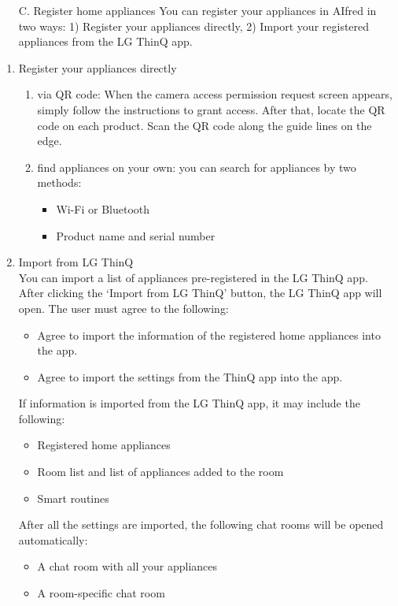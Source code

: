 \documentclass[conference]{IEEEtran}
\begin{document}
\begin{itemize}
    \item [C.] Register home appliances 
    You can register your appliances in AIfred in two ways: 1) Register your appliances directly, 2) Import your registered appliances from the LG ThinQ app.
\end{itemize}

\begin{enumerate}
    \item Register your appliances directly
    \begin{enumerate}
        \item via QR code: When the camera access permission request screen appears, simply follow the instructions to grant access. After that, locate the QR code on each product. Scan the QR code along the guide lines on the edge.
        \item find appliances on your own: you can search for appliances by two methods:
        \begin{itemize}
            \item Wi-Fi or Bluetooth
            \item Product name and serial number
        \end{itemize}
    \end{enumerate}
    \item Import from LG ThinQ \\
    You can import a list of appliances pre-registered in the LG ThinQ app. After clicking the `Import from LG ThinQ' button, the LG ThinQ app will open. The user must agree to the following:
    \begin{itemize}
        \item Agree to import the information of the registered home appliances into the app.
        \item Agree to import the settings from the ThinQ app into the app.
    \end{itemize}
    If information is imported from the LG ThinQ app, it may include the following:
    \begin{itemize}
        \item Registered home appliances
        \item Room list and list of appliances added to the room
        \item Smart routines
    \end{itemize}
    After all the settings are imported, the following chat rooms will be opened automatically:
    \begin{itemize}
        \item A chat room with all your appliances
        \item A room-specific chat room \\
    \end{itemize} 
\end{enumerate}
\end{document}
